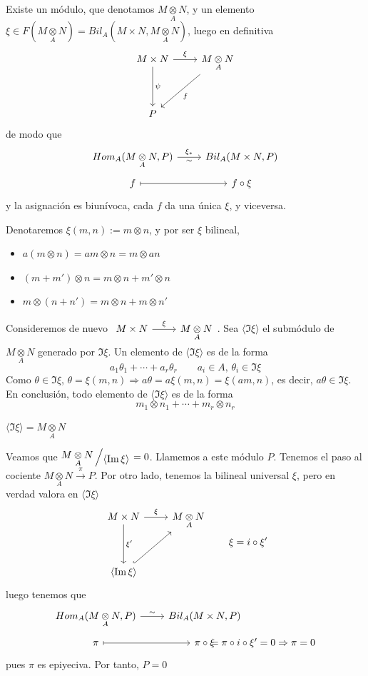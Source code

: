 \begin{cor}
    Existe un m\'odulo, que denotamos $M\underset{A}{\otimes}N$, y un elemento $\xi \in F(M\underset{A}{\otimes}N) = Bil_A(M\times N, M\underset{A}{\otimes}N)$, luego en definitiva
    $$\bt M\times N \arrow{d}{\psi} \arrow{r}{\xi} & \arrow{dl}{f} M\underset{A}{\otimes}N \\[5mm] P \et$$
    de modo que $$\bt Hom_A(M\underset{A}{\otimes}N, P) \arrow{r}{\xi_*}[swap]{\sim} & Bil_A(M\times N, P) \\[-5mm] f \arrow[mapsto]{r} & f\circ \xi \et$$
    y la asignaci\'on es biun\'ivoca, cada $f$ da una \'unica $\xi$, y viceversa.

    Denotaremos $\xi(m,n):=m \otimes n$, y por ser $\xi$ bilineal, \vspace{-5mm}
    \begin{itemize}
        \item $a(m \otimes n) = am \otimes n = m \otimes an$
        \item $(m+m')\otimes n = m \otimes n +m'\otimes n$
        \item $m\otimes (n+n')= m \otimes n + m \otimes n'$
    \end{itemize}

    Consideremos de nuevo $\bt M\times N  \arrow{r}{\xi} & M \underset{A}{\otimes} N\et$. 
    Sea $\langle \Im \xi \rangle$ el subm\'odulo de $M \underset{A}{\otimes} N$ generado por $\Im \xi$. Un elemento de $\langle \Im \xi \rangle$ es de la forma 
    $$a_1\theta_1 + \cdots + a_r \theta_r \qquad a_i \in A, \, \theta_i \in \Im \xi$$
    Como $\theta \in \Im \xi$, $\theta = \xi(m,n) \Rightarrow a\theta = a \xi(m,n) = \xi(am,n)$, es decir, $a\theta \in \Im \xi$. En conclusi\'on, todo elemento de $\langle \Im \xi \rangle$ es de la forma
    $$m_1 \otimes n_1 + \cdots + m_r \otimes n_r$$
\end{cor}
\begin{prop}
    $\langle \Im \xi \rangle = M \underset{A}{\otimes} N$
\end{prop}
\begin{dem}
    Veamos que $\modulo{M\underset{A}{\otimes}N}{\langle \Im \xi \rangle} = 0$. Llamemos a este m\'odulo $P$. Tenemos el paso al cociente $M\underset{A}{\otimes}N \overset{\pi}{\longrightarrow} P$. Por otro lado, tenemos la bilineal universal $\xi$, pero en verdad valora en $\langle \Im \xi \rangle$
    $$\bt M \times N \arrow{r}{\xi} \arrow{d}{\xi'} & M \underset{A}{\otimes} N \\[5mm] \langle \Im \xi \rangle \arrow[hook]{ur} \et \qquad \xi = i \circ \xi'$$
    luego tenemos que 
    $$\bt Hom_A(M \underset{A}{\otimes} N, P )\arrow{r}{\sim} & Bil_A(M \times N, P) \\[-5mm] \pi \arrow[mapsto]{r} & \pi \circ \xi &[-22mm] = \pi \circ i \circ \xi' = 0 \Rightarrow \pi =0 \et$$
    pues $\pi$ es epiyeciva. Por tanto, $P=0$
\end{dem}
